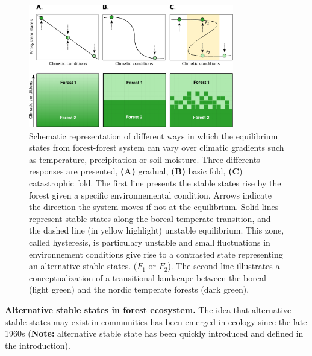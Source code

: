 \begin{figure}[t]
	\begin{center}
	\includegraphics[width=0.8\textwidth]{fig/states.pdf}
	\end{center}
	\caption{Schematic representation of different ways in which the equilibrium
	states from forest-forest system can vary over climatic gradients such as temperature, precipitation
	or soil moisture. Three differents responses are presented,
	\textbf{(A)} gradual, \textbf{(B)} basic fold, \textbf{(C}) catastrophic fold.
	The first line presents the stable states rise by the forest
	given a specific environnemental condition. Arrows indicate the
	direction the system moves if not at the equilibrium. 
	Solid lines represent stable states along the boreal-temperate
	transition, and the dashed line (in yellow highlight) unstable equilibrium. This zone,
	called hysteresis, is particulary unstable and small fluctuations in
	environnement conditions give rise to a contrasted state representing an
	alternative stable states. ($F_1$ or $F_2$). 
	The second line illustrates a conceptualization of a transitional landscape
	between the boreal (light green) and the nordic temperate forests (dark
	green).}
	\label{fig1}
\end{figure}



\textbf{Alternative stable states in forest ecosystem.} The idea that
alternative stable states may exist in communities has been emerged in ecology
since the late 1960s \cite{Scheffer2001,Society2014a}
(\textbf{Note:} alternative stable state has been quickly introduced and
defined in the introduction). 

